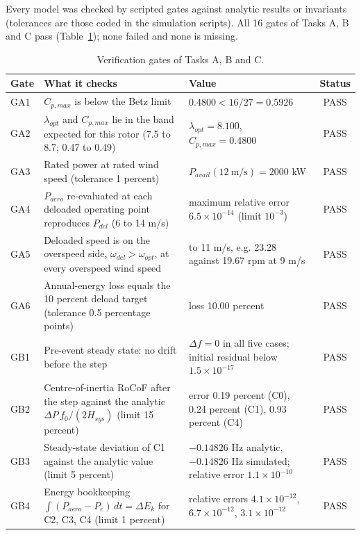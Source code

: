 Every model was checked by scripted gates against analytic results or invariants (tolerances are those coded in the simulation scripts). All 16 gates of Tasks A, B and C pass (Table~\ref{tab:gates}); none failed and none is missing.

\begin{table}[H]\centering\footnotesize\setlength{\tabcolsep}{3pt}\renewcommand{\arraystretch}{1.12}
\caption{Verification gates of Tasks A, B and C.}\label{tab:gates}
\begin{tabular}{@{}l>{\raggedright\arraybackslash}p{5.3cm}>{\raggedright\arraybackslash}p{8.3cm}c@{}}\toprule
Gate & What it checks & Value & Status\\\midrule
GA1 & $C_{p,max}$ is below the Betz limit & $0.4800<16/27=0.5926$ & PASS\\
GA2 & $\lambda_{opt}$ and $C_{p,max}$ lie in the band expected for this rotor (7.5 to 8.7; 0.47 to 0.49) & $\lambda_{opt}=8.100$, $C_{p,max}=0.4800$ & PASS\\
GA3 & Rated power at rated wind speed (tolerance 1 percent) & $P_{avail}(12\ \mathrm{m/s})=2000$ kW & PASS\\
GA4 & $P_{aero}$ re-evaluated at each deloaded operating point reproduces $P_{del}$ (6 to 14 m/s) & maximum relative error $6.5\times10^{-14}$ (limit $10^{-3}$) & PASS\\
GA5 & Deloaded speed is on the overspeed side, $\omega_{del}>\omega_{opt}$, at every overspeed wind speed & 6 to 11 m/s, e.g. 23.28 against 19.67 rpm at 9 m/s & PASS\\
GA6 & Annual-energy loss equals the 10 percent deload target (tolerance 0.5 percentage points) & loss 10.00 percent & PASS\\\midrule
GB1 & Pre-event steady state: no drift before the step & $\Delta f=0$ in all five cases; initial residual below $1.5\times10^{-17}$ & PASS\\
GB2 & Centre-of-inertia RoCoF after the step against the analytic $\Delta P\,f_0/(2H_{sys})$ (limit 15 percent) & error 0.19 percent (C0), 0.24 percent (C1), 0.93 percent (C4) & PASS\\
GB3 & Steady-state deviation of C1 against the analytic value (limit 5 percent) & $-0.14826$ Hz analytic, $-0.14826$ Hz simulated; relative error $1.1\times10^{-10}$ & PASS\\
GB4 & Energy bookkeeping $\int(P_{aero}-P_e)\,dt=\Delta E_k$ for C2, C3, C4 (limit 1 percent) & relative errors $4.1\times10^{-12}$, $6.7\times10^{-12}$, $3.1\times10^{-12}$ & PASS\\

\end{tabular}
\end{table}
